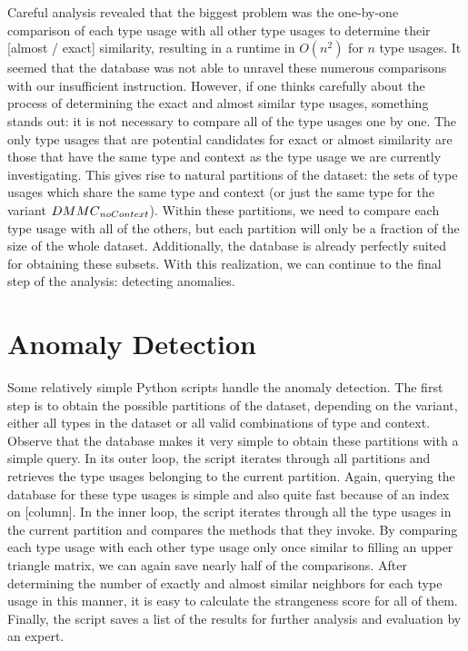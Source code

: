 Careful analysis revealed that the biggest problem was the one-by-one comparison of each type usage with all other type usages to determine their [almost / exact] similarity, resulting in a runtime in $O(n^2)$ for $n$ type usages.
It seemed that the database was not able to unravel these numerous comparisons with our insufficient instruction.
However, if one thinks carefully about the process of determining the exact and almost similar type usages, something stands out: it is not necessary to compare all of the type usages one by one.
The only type usages that are potential candidates for exact or almost similarity are those that have the same type and context as the type usage we are currently investigating.
This gives rise to natural partitions of the dataset: the sets of type usages which share the same type and context (or just the same type for the variant $\mathnormal{DMMC}_\mathnormal{noContext}$).
Within these partitions, we need to compare each type usage with all of the others, but each partition will only be a fraction of the size of the whole dataset.
Additionally, the database is already perfectly suited for obtaining these subsets.
With this realization, we can continue to the final step of the analysis: detecting anomalies.

\section{Anomaly Detection}\label{sec:anomaly}


Some relatively simple Python scripts handle the anomaly detection.
The first step is to obtain the possible partitions of the dataset, depending on the variant, either all types in the dataset or all valid combinations of type and context.
Observe that the database makes it very simple to obtain these partitions with a simple query.
In its outer loop, the script iterates through all partitions and retrieves the type usages belonging to the current partition.
Again, querying the database for these type usages is simple and also quite fast because of an index on [column].
In the inner loop, the script iterates through all the type usages in the current partition and compares the methods that they invoke.
By comparing each type usage with each other type usage only once similar to filling an upper triangle matrix, we can again save nearly half of the comparisons.
After determining the number of exactly and almost similar neighbors for each type usage in this manner, it is easy to calculate the strangeness score for all of them.
Finally, the script saves a list of the results for further analysis and evaluation by an expert.

